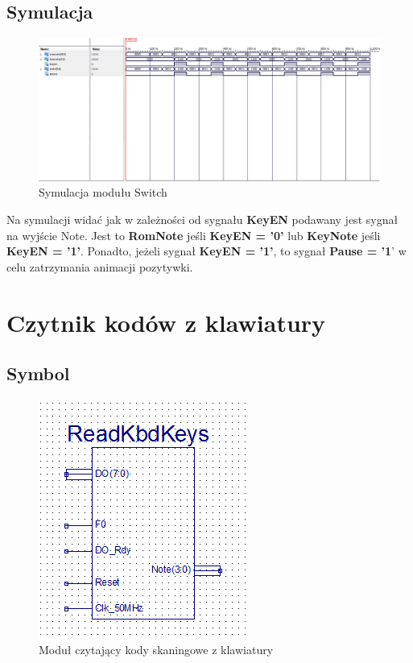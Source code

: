 \documentclass[a4paper]{report}
\begin{document}
		\begin{landscape}
			\subsection{Symulacja}
				\begin{figure}[h!]
					\centering
					\includegraphics[width=1.6\textwidth]{switch_symulacja2.png}
					\caption{Symulacja modułu Switch}
				\end{figure}
			\justify
            Na symulacji widać jak w zależności od sygnału \textbf{KeyEN} podawany jest sygnał na wyjście Note. 
            Jest to \textbf{RomNote} jeśli \textbf{KeyEN = '0'} lub \textbf{KeyNote} jeśli \textbf{KeyEN = '1'}.
            Ponadto, jeżeli sygnał \textbf{KeyEN = '1'}, to sygnał \textbf{Pause = '1}' w celu zatrzymania animacji pozytywki.
		\end{landscape}
		
	\section{Czytnik kodów z klawiatury}
		\subsection{Symbol}
			\begin{figure}[h!]
				\centering				
				\includegraphics{readkbdkeys2.png}
				\caption{Moduł czytający kody skaningowe z klawiatury}
			\end{figure}
\end{document}
